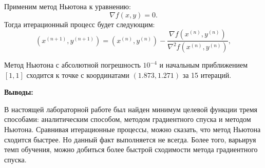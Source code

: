 Применим метод Ньютона к уравнению:
\begin{equation}
    \nabla f(x, y) = 0.
\end{equation}
Тогда итерационный процесс будет следующим:
\begin{equation}
    (x^{(n + 1)}, y^{(n + 1)}) = (x^{(n)}, y^{(n)}) - \frac{\nabla f(x^{(n)}, y^{(n)})}{\nabla ^ 2 f(x^{(n)}, y^{(n)})},
\end{equation}

Метод Ньютона с абсолютной погрешность $10^{-4}$ и начальным приближением $[1, 1]$ сходится к точке с координатами $(1.873, 1.271)$ за 15 итераций.

\textbf{Выводы:}

В настоящей лабораторной работе был найден минимум целевой функции тремя способами: аналитическим способом, методом градиентного спуска и методом Ньютона. Сравнивая итерационные процессы, можно сказать, что метод Ньютона сходится быстрее. Но данный факт выполняется не всегда. Более того, варьируя темп обучения, можно добиться более быстрой сходимости метода градиентного спуска.